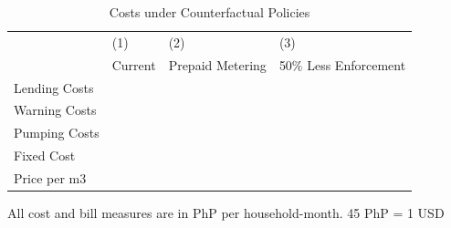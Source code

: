 \documentclass[12pt,table]{article}
\begin{document}
\begin{table}[H]
\centering
\caption{Costs under Counterfactual Policies}\label{table:countercosts}
\begin{threeparttable}
\begin{tabular}{@{}l*{1}{EEE}@{}}
\toprule
 & (1)    & (2)          & (3)   \\
 & Current & Prepaid Metering & 50\% Less Enforcement   \\
\midrule
Lending Costs  &   &   &   \\
Warning Costs &  &     &     \\
Pumping Costs  &    &     &     \\
Fixed Cost &    &       &     \\
Price per m3  &   &     &    \\
\bottomrule
\end{tabular}
\begin{tablenotes}
\item \footnotesize 
 All cost and bill measures are in PhP per household-month.  45 PhP = 1 USD
\end{tablenotes}
\end{threeparttable}
\end{table}
\end{document}
